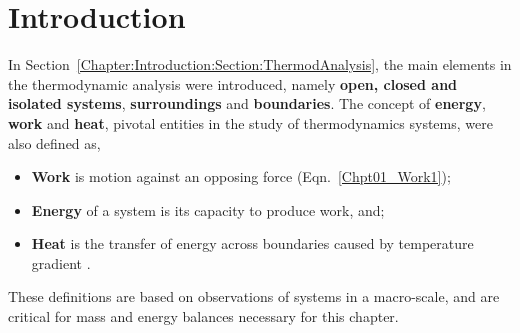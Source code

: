 \localtableofcontents
   
     \section{Introduction}\label{Chapter:FirstLaw:Section:Intro}
     In Section~\ref{Chapter:Introduction:Section:ThermodAnalysis}, the main elements in the thermodynamic analysis were introduced, namely {\bf open, closed and isolated systems}, {\bf surroundings} and {\bf boundaries}. The concept of {\bf energy}, {\bf work} and {\bf heat}, pivotal entities in the study of thermodynamics systems, were also defined as,
     \begin{itemize}
        \item {\bf Work} is motion against an opposing force (Eqn.~\ref{Chpt01_Work1});
        \item {\bf Energy} of a system is its capacity to produce work, and; 
        \item {\bf Heat} is the transfer of energy across boundaries caused by temperature gradient \citep{Devoe_Book}.
     \end{itemize}
     These definitions are based on observations of systems in a macro-scale, and are critical for mass and energy balances necessary for this chapter. 

